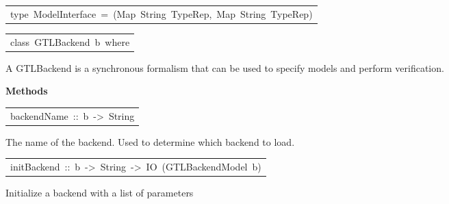 \begin{haddockdesc}
\item[\begin{tabular}{@{}l}
type\ ModelInterface\ =\ (Map\ String\ TypeRep,\ Map\ String\ TypeRep)
\end{tabular}]
\end{haddockdesc}
\begin{haddockdesc}
\item[\begin{tabular}{@{}l}
class\ GTLBackend\ b\ where
\end{tabular}]\haddockbegindoc
A GTLBackend is a synchronous formalism that can be used to specify models and perform verification.
\par

\haddockpremethods{}\textbf{Methods}
\begin{haddockdesc}
\item[\begin{tabular}{@{}l}
backendName\ ::\ b\ ->\ String
\end{tabular}]\haddockbegindoc
The name of the backend. Used to determine which backend to load.
\par

\end{haddockdesc}
\begin{haddockdesc}
\item[\begin{tabular}{@{}l}
initBackend\ ::\ b\ ->\ {\char 91}String{\char 93}\ ->\ IO\ (GTLBackendModel\ b)
\end{tabular}]\haddockbegindoc
Initialize a backend with a list of parameters
\par

\end{haddockdesc}
\end{haddockdesc}
